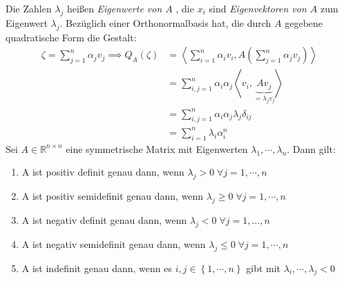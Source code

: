 Die Zahlen $ \lambda_j $ heißen \textit{Eigenwerte von $ A $ }, die $ x_i $ sind \textit{ Eigenvektoren von $ A $ } zum Eigenwert 
$ \lambda_j $. Bezüglich einer Orthonormalbasis hat, die durch $ A $ gegebene quadratische Form die Gestalt:
\begin{align*} 
	\zeta = \sum_{j=1}^{n} \alpha_j v_j \implies Q_{A} \left(\zeta\right)  &= \left< \sum_{i = 1}^{n} \alpha_i v_i, A \left(
\sum_{j=1}^{n} \alpha_j v_j\right)  \right>\\
	&=  \sum_{i,j = 1}^{n}\alpha_i\alpha_j\left<v_i,\underbrace{A v_j}_{=\lambda_j v_j} \right> \\
	&= \sum_{i,j = 1}^{n} \alpha_i \alpha_j \lambda_{j} \delta_{ij} \\
	&= \sum_{i=1}^{n} \lambda_i \alpha_{i}^{n}
\end{align*}
 Sei $ A \in  \mathbb{R}^{n \times n} $ eine symmetrische Matrix mit Eigenwerten $ \lambda_{1} , \cdots,  \lambda_{n} $. Dann gilt:
 \begin{enumerate}[label=\alph*)]
 	\item A ist positiv definit genau dann, wenn $ \lambda_j > 0 \; \forall j = 1 , \cdots,  n $ 
 	\item A ist positiv semidefinit genau dann, wenn $ \lambda_j \geq 0 \; \forall j = 1 , \cdots,  n $ 
 	\item A ist negativ definit genau dann, wenn $ \lambda_j < 0 \; \forall j = 1 , \ldots,  n $ 
 	\item A ist negativ semidefinit genau dann, wenn $ \lambda_j \leq  0 \; \forall j = 1 , \cdots,  n $ 
 	\item A ist  indefinit genau dann, wenn es $ i,j \in  \left\{ 1, \cdots,  n \right\}  $ gibt mit $ \lambda_i , \cdots, \lambda_j < 0 $ 
 \end{enumerate}

